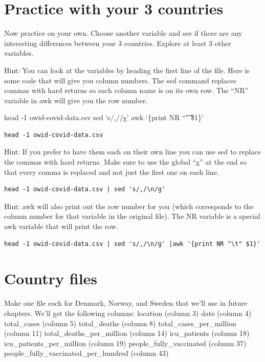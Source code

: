 \documentclass[
]{book}
\begin{document}
\hypertarget{practice-with-your-3-countries}{%
\section{Practice with your 3 countries}\label{practice-with-your-3-countries}}

Now practice on your own. Choose another variable and see if there are any interesting differences between your 3 countries. Explore at least 3 other variables.

Hint: You can look at the variables by heading the first line of the file. Here is some code that will give you column numbers. The sed command replaces commas with hard returns so each column name is on its own row. The ``NR'' variable in awk will give you the row number.

head -1 owid-covid-data.csv \textbar{} sed `s/,/\n/g' \textbar{} awk `\{print NR ``\t" \$1\}'

\begin{verbatim}
head -1 owid-covid-data.csv
\end{verbatim}

Hint: If you prefer to have them each on their own line you can use sed to replace the commas with hard returns. Make sure to use the global ``g'' at the end so that every comma is replaced and not just the first one on each line.

\begin{verbatim}
head -1 owid-covid-data.csv | sed 's/,/\n/g'
\end{verbatim}

Hint: awk will also print out the row number for you (which corresponds to the column number for that variable in the original file). The NR variable is a special awk variable that will print the row.

\begin{verbatim}
head -1 owid-covid-data.csv | sed 's/,/\n/g' |awk '{print NR "\t" $1}'
\end{verbatim}

\hypertarget{country-files}{%
\section{Country files}\label{country-files}}

Make one file each for Denmark, Norway, and Sweden that we'll use in future chapters. We'll get the following columns:
location (column 3)
date (column 4)
total\_cases (column 5)
total\_deaths (column 8)
total\_cases\_per\_million (column 11)
total\_deaths\_per\_million (column 14)
icu\_patients (column 18)
icu\_patients\_per\_million (column 19)
people\_fully\_vaccinated (column 37)
people\_fully\_vaccinated\_per\_hundred (column 43)
\end{document}
